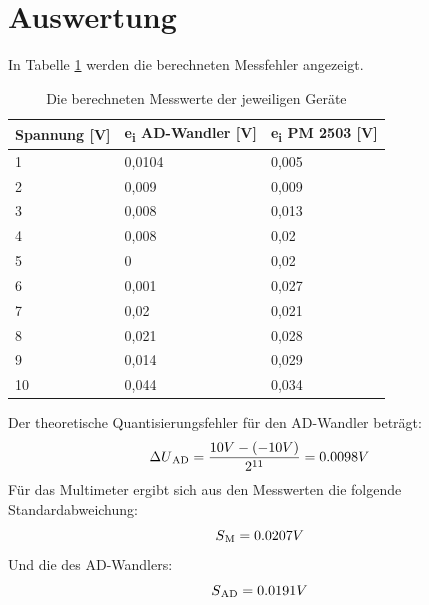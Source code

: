 \documentclass[12pt, oneside, a4paper, \docLanguage]{report}
\begin{document}
\section{Auswertung}
\label{chap:VERSUCH_1_AUSWERTUNG}
In Tabelle \ref{fig:VERSUCH_1_auswertung} werden die berechneten Messfehler angezeigt.
\begin{table}[H]
\centering
\begin{tabular}{|l|l|l|}
\hline
\multicolumn{1}{|c|}{\textbf{Spannung {[}V{]}}} & \textbf{e\textsubscript{i} AD-Wandler {[}V{]}} & \textbf{e\textsubscript{i} PM 2503 {[}V{]}} \\ \hline
1                                               & 0,0104                         & 0,005                       \\ \hline
2                                               & 0,009                          & 0,009                       \\ \hline
3                                               & 0,008                          & 0,013                       \\ \hline
4                                               & 0,008                          & 0,02                        \\ \hline
5                                               & 0                              & 0,02                        \\ \hline
6                                               & 0,001                          & 0,027                       \\ \hline
7                                               & 0,02                           & 0,021                       \\ \hline
8                                               & 0,021                          & 0,028                       \\ \hline
9                                               & 0,014                          & 0,029                       \\ \hline
10                                              & 0,044                          & 0,034                       \\ \hline
\end{tabular}
\caption{Die berechneten Messwerte der jeweiligen Geräte}
\label{fig:VERSUCH_1_auswertung}
\end{table}
\noindent
Der theoretische Quantisierungsfehler für den AD-Wandler beträgt:
\begin{equation*}
\Delta U\textsubscript{AD} = \frac{10V - (-10V)}{2\textsuperscript{11}} = 0.0098V
\end{equation*}
Für das Multimeter ergibt sich aus den Messwerten die folgende Standardabweichung:
\begin{equation*}
S\textsubscript{M} = 0.0207V
\end{equation*}
Und die des AD-Wandlers:
\begin{equation*}
S\textsubscript{AD} = 0.0191V
\end{equation*}
\end{document}
